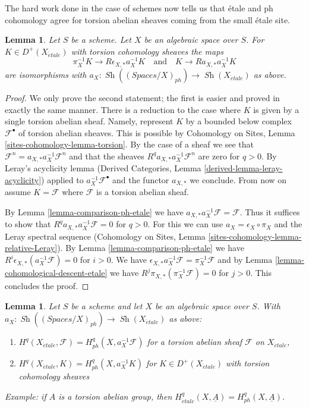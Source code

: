 \documentclass{stacks-project}
\theoremstyle{plain}
\newtheorem{lemma}[subsection]{Lemma}
\theoremstyle{definition}
\theoremstyle{remark}
\numberwithin{equation}{subsection}
\def\Sh{\mathop{\mathit{Sh}}\nolimits}
\def\etale{{\acute{e}tale}}
\begin{document}
\noindent
The hard work done in the case of schemes now tells us that
\'etale and ph cohomology agree for torsion abelian sheaves coming from the
small \'etale site.

\begin{lemma}
\label{lemma-cohomological-descent-etale-ph}
Let $S$ be a scheme. Let $X$ be an algebraic space over $S$.
For $K \in D^+(X_\etale)$ with torsion cohomology sheaves the maps
$$
\pi_X^{-1}K \longrightarrow R\epsilon_{X, *}a_X^{-1}K
\quad\text{and}\quad
K \longrightarrow Ra_{X, *}a_X^{-1}K
$$
are isomorphisms with
$a_X : \Sh((\textit{Spaces}/X)_{ph}) \to \Sh(X_\etale)$ as above.
\end{lemma}

\begin{proof}
We only prove the second statement; the first is easier and proved in exactly
the same manner. There is a reduction to the case where
$K$ is given by a single torsion abelian sheaf. Namely, represent $K$
by a bounded below complex $\mathcal{F}^\bullet$ of torsion
abelian sheaves. This is possible by Cohomology on Sites, Lemma
\ref{sites-cohomology-lemma-torsion}.
By the case of a sheaf we see that
$\mathcal{F}^n = a_{X, *} a_X^{-1} \mathcal{F}^n$
and that the sheaves $R^qa_{X, *}a_X^{-1}\mathcal{F}^n$
are zero for $q > 0$. By Leray's acyclicity lemma
(Derived Categories, Lemma \ref{derived-lemma-leray-acyclicity})
applied to $a_X^{-1}\mathcal{F}^\bullet$
and the functor $a_{X, *}$ we conclude. From now on assume
$K = \mathcal{F}$ where $\mathcal{F}$ is a torsion abelian sheaf.

\medskip\noindent
By Lemma \ref{lemma-comparison-ph-etale} we have
$a_{X, *}a_X^{-1}\mathcal{F} = \mathcal{F}$. Thus it suffices to show that
$R^qa_{X, *}a_X^{-1}\mathcal{F} = 0$ for $q > 0$.
For this we can use $a_X = \epsilon_X \circ \pi_X$ and
the Leray spectral sequence
(Cohomology on Sites, Lemma \ref{sites-cohomology-lemma-relative-Leray}).
By Lemma \ref{lemma-comparison-ph-etale}
we have $R^i\epsilon_{X, *}(a_X^{-1}\mathcal{F}) = 0$ for $i > 0$.
We have
$\epsilon_{X, *}a_X^{-1}\mathcal{F} = \pi_X^{-1}\mathcal{F}$
and by Lemma \ref{lemma-cohomological-descent-etale} we have
$R^j\pi_{X, *}(\pi_X^{-1}\mathcal{F}) = 0$ for $j > 0$.
This concludes the proof.
\end{proof}

\begin{lemma}
\label{lemma-compare-cohomology-etale-ph}
Let $S$ be a scheme and let $X$ be an algebraic space over $S$.
With $a_X : \Sh((\textit{Spaces}/X)_{ph}) \to \Sh(X_\etale)$
as above:
\begin{enumerate}
\item $H^q(X_\etale, \mathcal{F}) = H^q_{ph}(X, a_X^{-1}\mathcal{F})$
for a torsion abelian sheaf $\mathcal{F}$ on $X_\etale$,
\item $H^q(X_\etale, K) = H^q_{ph}(X, a_X^{-1}K)$ for $K \in D^+(X_\etale)$
with torsion cohomology sheaves
\end{enumerate}
Example: if $A$ is a torsion abelian group, then
$H^q_\etale(X, \underline{A}) = H^q_{ph}(X, \underline{A})$.
\end{lemma}
\end{document}
